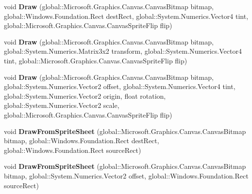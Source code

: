 \begin{DoxyCompactItemize}
void {\bfseries Draw} (global\+::\+Microsoft.\+Graphics.\+Canvas.\+Canvas\+Bitmap bitmap, global\+::\+Windows.\+Foundation.\+Rect dest\+Rect, global\+::\+System.\+Numerics.\+Vector4 tint, global\+::\+Microsoft.\+Graphics.\+Canvas.\+Canvas\+Sprite\+Flip flip)
\item 
\mbox{\label{class_microsoft_1_1_graphics_1_1_canvas_1_1_canvas_sprite_batch_a6ce7fa9de20ecdd859df4d33baa22b96}} 
void {\bfseries Draw} (global\+::\+Microsoft.\+Graphics.\+Canvas.\+Canvas\+Bitmap bitmap, global\+::\+System.\+Numerics.\+Matrix3x2 transform, global\+::\+System.\+Numerics.\+Vector4 tint, global\+::\+Microsoft.\+Graphics.\+Canvas.\+Canvas\+Sprite\+Flip flip)
\item 
\mbox{\label{class_microsoft_1_1_graphics_1_1_canvas_1_1_canvas_sprite_batch_ad594e0d83883455fdc71585e3b4b4b46}} 
void {\bfseries Draw} (global\+::\+Microsoft.\+Graphics.\+Canvas.\+Canvas\+Bitmap bitmap, global\+::\+System.\+Numerics.\+Vector2 offset, global\+::\+System.\+Numerics.\+Vector4 tint, global\+::\+System.\+Numerics.\+Vector2 origin, float rotation, global\+::\+System.\+Numerics.\+Vector2 scale, global\+::\+Microsoft.\+Graphics.\+Canvas.\+Canvas\+Sprite\+Flip flip)
\item 
\mbox{\label{class_microsoft_1_1_graphics_1_1_canvas_1_1_canvas_sprite_batch_aad806d7034e245c959c707dc4391e844}} 
void {\bfseries Draw\+From\+Sprite\+Sheet} (global\+::\+Microsoft.\+Graphics.\+Canvas.\+Canvas\+Bitmap bitmap, global\+::\+Windows.\+Foundation.\+Rect dest\+Rect, global\+::\+Windows.\+Foundation.\+Rect source\+Rect)
\item 
\mbox{\label{class_microsoft_1_1_graphics_1_1_canvas_1_1_canvas_sprite_batch_a92f0f8a12c6342a95d48002a8fd3b11c}} 
void {\bfseries Draw\+From\+Sprite\+Sheet} (global\+::\+Microsoft.\+Graphics.\+Canvas.\+Canvas\+Bitmap bitmap, global\+::\+System.\+Numerics.\+Vector2 offset, global\+::\+Windows.\+Foundation.\+Rect source\+Rect)
\item 
\mbox{\label{class_microsoft_1_1_graphics_1_1_canvas_1_1_canvas_sprite_batch_a0d74b7bfe143a9832126256d47c187e6}} 

\end{DoxyCompactItemize}
